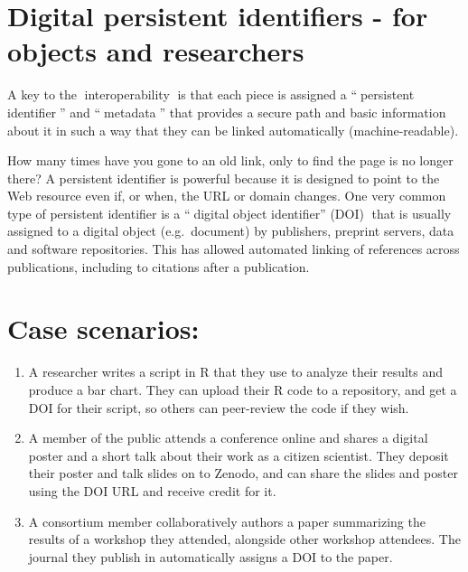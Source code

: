 \documentclass[
  letterpaper,
  DIV=11,
  numbers=noendperiod]{scrreport}
\providecommand{\tightlist}{%
  \setlength{\itemsep}{0pt}\setlength{\parskip}{0pt}}\usepackage{longtable,booktabs,array}
\begin{document}
\hypertarget{digital-persistent-identifiers---for-objects-and-researchers}{%
\section{Digital persistent identifiers - for objects and
researchers}\label{digital-persistent-identifiers---for-objects-and-researchers}}

A key to the {📖}interoperability{📖} is that each piece is assigned a
``📖{persistent identifier📖}'' and ``{📖metadata📖}'' that provides a
secure path and basic information about it in such a way that they can
be linked automatically (machine-readable).

How many times have you gone to an old link, only to find the page is no
longer there? A persistent identifier is powerful because it is designed
to point to the Web resource even if, or when, the URL or domain
changes. One very common type of persistent identifier is a ``📖digital
object identifier'' (DOI)📖 that is usually assigned to a digital object
(e.g.~document) by publishers, preprint servers, data and software
repositories. This has allowed automated linking of references across
publications, including to citations after a publication.

\hypertarget{case-scenarios-1}{%
\section{Case scenarios:}\label{case-scenarios-1}}

\begin{enumerate}
\def\labelenumi{\arabic{enumi}.}
\tightlist
\item
  A researcher writes a script in R that they use to analyze their
  results and produce a bar chart. They can upload their R code to a
  repository, and get a DOI for their script, so others can peer-review
  the code if they wish.
\item
  A member of the public attends a conference online and shares a
  digital poster and a short talk about their work as a citizen
  scientist. They deposit their poster and talk slides on to Zenodo, and
  can share the slides and poster using the DOI URL and receive credit
  for it.
\item
  A consortium member collaboratively authors a paper summarizing the
  results of a workshop they attended, alongside other workshop
  attendees. The journal they publish in automatically assigns a DOI to
  the paper.
\end{enumerate}
\end{document}
